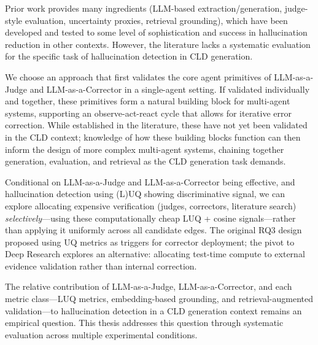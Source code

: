 Prior work provides many ingredients (LLM-based extraction/generation, judge-style evaluation, uncertainty proxies, retrieval grounding), which have been developed and tested to some level of sophistication and success in hallucination reduction in other contexts. However, the literature lacks a systematic evaluation for the specific task of hallucination detection in CLD generation.

We choose an approach that first validates the core agent primitives of LLM-as-a-Judge and LLM-as-a-Corrector in a single-agent setting. If validated individually and together, these primitives form a natural building block for multi-agent systems, supporting an observe-act-react cycle that allows for iterative error correction. While established in the literature, these have not yet been validated in the CLD context; knowledge of how these building blocks function can then inform the design of more complex multi-agent systems, chaining together generation, evaluation, and retrieval as the CLD generation task demands.

Conditional on LLM-as-a-Judge and LLM-as-a-Corrector being effective, and hallucination detection using (L)UQ showing discriminative signal, we can explore allocating expensive verification (judges, correctors, literature search) \emph{selectively}---using these computationally cheap LUQ + cosine signals---rather than applying it uniformly across all candidate edges. The original RQ3 design proposed using UQ metrics as triggers for corrector deployment; the pivot to Deep Research explores an alternative: allocating test-time compute to external evidence validation rather than internal correction.

The relative contribution of LLM-as-a-Judge, LLM-as-a-Corrector, and each metric class---LUQ metrics, embedding-based grounding, and retrieval-augmented validation---to hallucination detection in a CLD generation context remains an empirical question. This thesis addresses this question through systematic evaluation across multiple experimental conditions.